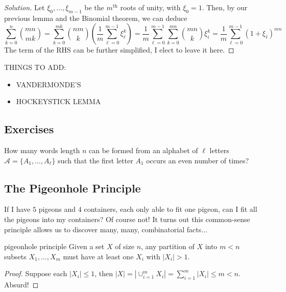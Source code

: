 \documentclass{article}
\begin{document}
\begin{proof}[Solution]
    Let $\xi_0, \dots, \xi_{m-1}$ be the $m^\text{th}$ roots of unity, with $\xi_0 = 1$. Then, by our previous lemma and the Binomial theorem,
    we can deduce 
    \[\sum_{k=0}^{n}\binom{mn}{mk} = \sum_{k=0}^{mk}\binom{nm}{k}\left(\frac{1}{m}\sum_{\ell = 0}^{m-1}\xi_\ell^k\right) 
    = \frac{1}{m}\sum_{\ell = 0}^{m-1} \sum_{k=0}^{mn} \binom{mn}{k}\xi_i^k = \frac{1}{m}\sum_{\ell = 0}^{m-1} (1+\xi_\ell)^{mn}\]
    The term of the RHS can be further simplified, I elect to leave it here. 
\end{proof}

THINGS TO ADD:
\begin{itemize}
\item VANDERMONDE'S
\item HOCKEYSTICK LEMMA 
\end{itemize}


\subsection*{Exercises}

\begin{exercise}[]{}
    How many words length $n$ can be formed from an alphabet of $\ell$ letters $\mathcal{A} = \{A_1, \dots, A_\ell\}$ such that the first letter 
    $A_1$ occurs an even number of times?
\end{exercise}

\subsection{The Pigeonhole Principle}

If I have $5$ pigeons and $4$ containers, each only able to fit one pigeon, can I fit all the pigeons into my containers? Of course not! It turns 
out this common-sense principle allows us to discover many, many, combinatorial facts$\dots$

\begin{theorem}[]{pigeonhole principle}
    Given a set $X$ of size $n$, any partition of $X$ into $m < n$ subsets $X_1, \dots, X_m$ must have at least one $X_i$ with $|X_i| > 1$. 
\end{theorem}

\begin{proof}
    Suppose each $|X_i| \leq 1$, then $|X| = |\cup_{i=1}^m X_i| = \sum_{i=1}^m |X_i| \leq m < n$. Absurd!
\end{proof}
\end{document}

